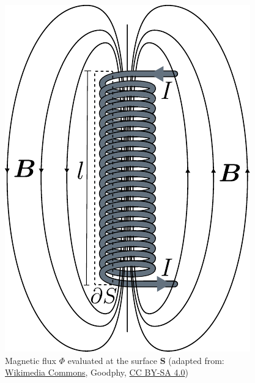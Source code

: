 \begin{frame}
\begin{columns}
\begin{column}{0.425\textwidth}
\begin{figure}
				\includegraphics[height=0.68\textheight]{fig/lec02/Solenoid_Ampere_law.pdf}
				\caption{Magnetic flux $\Phi$ evaluated at the surface $\bm{S}$  (adapted from: \href{https://commons.wikimedia.org/wiki/File:Solenoid_and_Ampere_Law.png}{Wikimedia Commons}, Goodphy, \href{https://creativecommons.org/licenses/by-sa/4.0/deed.en}{CC BY-SA 4.0})}
			\end{figure}
		\end{column}
		\end{columns}
\end{frame}

